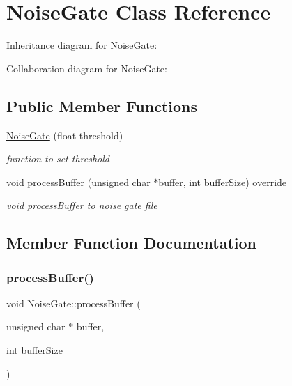 \hypertarget{classNoiseGate}{}\section{Noise\+Gate Class Reference}
\label{classNoiseGate}


Inheritance diagram for Noise\+Gate\+:


Collaboration diagram for Noise\+Gate\+:
\subsection*{Public Member Functions}
\begin{DoxyCompactItemize}
\item 
\mbox{\label{classNoiseGate_a85612134d9528c0d188af89ff9d4701f}} 
\hyperlink{classNoiseGate_a85612134d9528c0d188af89ff9d4701f}{Noise\+Gate} (float threshold)
\begin{DoxyCompactList}\small\item\em function to set threshold \end{DoxyCompactList}\item 
void \hyperlink{classNoiseGate_acab8baa73ab66ee5c377631c2c1f3c72}{process\+Buffer} (unsigned char $\ast$buffer, int buffer\+Size) override
\begin{DoxyCompactList}\small\item\em void process\+Buffer to noise gate file \end{DoxyCompactList}\end{DoxyCompactItemize}


\subsection{Member Function Documentation}
\mbox{\label{classNoiseGate_acab8baa73ab66ee5c377631c2c1f3c72}} 
\subsubsection{\texorpdfstring{process\+Buffer()}{processBuffer()}}
{\footnotesize\ttfamily void Noise\+Gate\+::process\+Buffer (\begin{DoxyParamCaption}\item[{unsigned char $\ast$}]{buffer,  }\item[{int}]{buffer\+Size }\end{DoxyParamCaption})\hspace{0.3cm}{\ttfamily [override]}}



